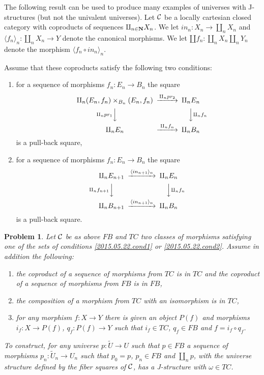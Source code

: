 \documentclass[12pt]{article}
\newtheorem{problem}[proposition]{Problem}
\newcommand{\llabel}[1]{\label{#1}}
\newcommand{\sr}{\rightarrow}
\newcommand{\nn}{{\bf N\rm}}
\newcommand{\wt}{\widetilde}
\begin{document}
The following result can be used to produce many examples of universes with J-structures (but not the univalent universes). Let $\cal C$ be a locally cartesian closed category with coproducts of sequences $\amalg_{n\in\nn}X_n$. We let $in_n:X_n\sr \amalg_n X_n$ and $\langle f_n \rangle_{n} : \amalg_n X_n\sr Y$ denote the canonical morphisms. We let $\amalg f_n : \amalg_n X_n \amalg_n Y_n$ denote the morphism $\langle f_n\circ in_n \rangle_{n}$. 

Assume that these coproducts satisfy the following two conditions:
%
\begin{enumerate}
\item for a sequence of morphisms $f_n:E_n\sr B_n$ the square
%
$$
\begin{CD}
\amalg_n (E_n,f_n)\times_{B_n}(E_n,f_n) @>\amalg_n pr_2>> \amalg_n E_n\\
@V \amalg_n pr_1 VV @VV \amalg_n f_n V\\
\amalg_n E_n @>\amalg_n f_n >> \amalg_n B_n
\end{CD}
$$
%
is a pull-back square,
%
\item for a sequence of morphisms $f_n:E_n\sr B_n$ the square
%
$$
\begin{CD}
\amalg_n E_{n+1} @> \langle in_{n+1} \rangle_{n} >> \amalg_n E_n\\
@V\amalg_n f_{n+1} VV @VV \amalg_n f_n V\\
\amalg_n B_{n+1} @> \langle in_{n+1} \rangle_{n} >> \amalg_n B_n
\end{CD}
$$
%
is a pull-back square. 
\end{enumerate}
%
%
\begin{problem}
\llabel{2015.05.22.th2}
Let $\cal C$ be as above $FB$ and $TC$ two classes of morphisms satisfying one of the sets of conditions \ref{2015.05.22.cond1} or \ref{2015.05.22.cond2}. Assume in addition the following:
%
\begin{enumerate}
\item the coproduct of a sequence of morphisms from $TC$ is in $TC$ and the coproduct of a sequence of morphisms from $FB$ is in $FB$,
\item the composition of a morphism from $TC$ with an isomorphism is in $TC$,
\item  for any morphism $f: X \sr Y$ there is given an object $P(f)$ and morphisms $i_f:X\sr P(f)$, $q_f:P(f)\sr Y$ such that $i_f\in TC$, $q_f\in FB$ and $f=i_f\circ q_f$.
\end{enumerate}
%
To construct, for any universe $p: \wt{U}\sr U$ such that $p\in FB$ a sequence of morphisms $p_n:\wt{U}_n\sr U_n$ such that $p_0=p$, $p_n\in FB$ and $\amalg_n p$, with the universe structure defined by the fiber squares of $\cal C$, has a J-structure with $\omega\in TC$.
\end{problem}
\end{document}
